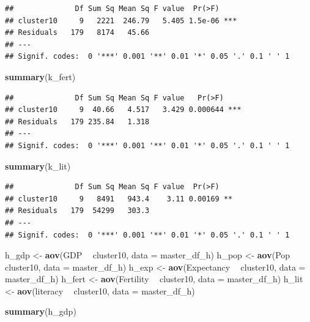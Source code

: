 \documentclass[]{article}
\newenvironment{Shaded}{\begin{snugshade}}{\end{snugshade}}
\newcommand{\DataTypeTok}[1]{\textcolor[rgb]{0.13,0.29,0.53}{#1}}
\newcommand{\KeywordTok}[1]{\textcolor[rgb]{0.13,0.29,0.53}{\textbf{#1}}}
\newcommand{\NormalTok}[1]{#1}
\newcommand{\OperatorTok}[1]{\textcolor[rgb]{0.81,0.36,0.00}{\textbf{#1}}}
\newcommand{\StringTok}[1]{\textcolor[rgb]{0.31,0.60,0.02}{#1}}
\begin{document}
\begin{verbatim}
##              Df Sum Sq Mean Sq F value  Pr(>F)    
## cluster10     9   2221  246.79   5.405 1.5e-06 ***
## Residuals   179   8174   45.66                    
## ---
## Signif. codes:  0 '***' 0.001 '**' 0.01 '*' 0.05 '.' 0.1 ' ' 1
\end{verbatim}

\begin{Shaded}
\begin{Highlighting}[]
\KeywordTok{summary}\NormalTok{(k_fert)}
\end{Highlighting}
\end{Shaded}

\begin{verbatim}
##              Df Sum Sq Mean Sq F value   Pr(>F)    
## cluster10     9  40.66   4.517   3.429 0.000644 ***
## Residuals   179 235.84   1.318                     
## ---
## Signif. codes:  0 '***' 0.001 '**' 0.01 '*' 0.05 '.' 0.1 ' ' 1
\end{verbatim}

\begin{Shaded}
\begin{Highlighting}[]
\KeywordTok{summary}\NormalTok{(k_lit)}
\end{Highlighting}
\end{Shaded}

\begin{verbatim}
##              Df Sum Sq Mean Sq F value  Pr(>F)   
## cluster10     9   8491   943.4    3.11 0.00169 **
## Residuals   179  54299   303.3                   
## ---
## Signif. codes:  0 '***' 0.001 '**' 0.01 '*' 0.05 '.' 0.1 ' ' 1
\end{verbatim}

\begin{Shaded}
\begin{Highlighting}[]
\NormalTok{h_gdp <-}\StringTok{ }\KeywordTok{aov}\NormalTok{(GDP }\OperatorTok{~}\StringTok{ }\NormalTok{cluster10, }\DataTypeTok{data =}\NormalTok{ master_df_h)}
\NormalTok{h_pop <-}\StringTok{ }\KeywordTok{aov}\NormalTok{(Pop }\OperatorTok{~}\StringTok{ }\NormalTok{cluster10, }\DataTypeTok{data =}\NormalTok{ master_df_h) }
\NormalTok{h_exp <-}\StringTok{ }\KeywordTok{aov}\NormalTok{(Expectancy }\OperatorTok{~}\StringTok{ }\NormalTok{cluster10, }\DataTypeTok{data =}\NormalTok{ master_df_h) }
\NormalTok{h_fert <-}\StringTok{ }\KeywordTok{aov}\NormalTok{(Fertility }\OperatorTok{~}\StringTok{ }\NormalTok{cluster10, }\DataTypeTok{data =}\NormalTok{ master_df_h) }
\NormalTok{h_lit <-}\StringTok{ }\KeywordTok{aov}\NormalTok{(literacy }\OperatorTok{~}\StringTok{ }\NormalTok{cluster10, }\DataTypeTok{data =}\NormalTok{ master_df_h) }

\KeywordTok{summary}\NormalTok{(h_gdp)}
\end{Highlighting}
\end{Shaded}
\end{document}
